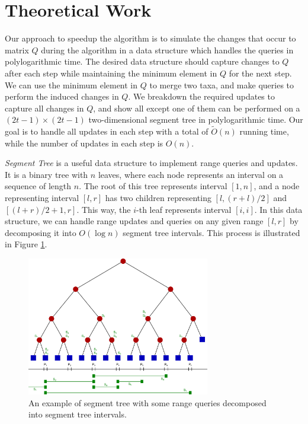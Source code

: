 \section{Theoretical Work}

Our approach to speedup the algorithm is to simulate the changes that occur to matrix $Q$ during the algorithm in a data structure which handles the queries in polylogarithmic time. The desired data structure should capture changes to $Q$ after each step while maintaining the minimum element in $Q$ for the next step. We can use the minimum element in $Q$ to merge two taxa, and make queries to perform the induced changes in $Q$. We breakdown the required updates to capture all changes in $Q$, and show all except one of them can be performed on a $(2t-1) \times (2t-1)$ two-dimensional segment tree in polylogarithmic time. Our goal is to handle all updates in each step with a total of $\widetilde{O}(n)$ running time, while the number of updates in each step is $O(n)$.

\emph{Segment Tree} is a useful data structure to implement range queries and updates. It is a binary tree with $n$ leaves, where each node represents an interval on a sequence of length $n$. The root of this tree represents interval $[1, n]$, and a node representing interval $[l, r]$ has two children representing $[l, (r + l) / 2]$ and $[(l + r) / 2 + 1, r]$. This way, the $i$-th leaf represents interval $[i, i]$. In this data structure, we can handle range updates and queries on any given range $[l, r]$ by decomposing it into $O(\log{n})$ segment tree intervals. This process is illustrated in Figure \ref{segment-tree}.

\begin{figure}[h!]\label{segment-tree}
	\caption{An example of segment tree with some range queries decomposed into segment tree intervals.}
	\begin{center}
		\includegraphics[width=8cm]{Segment_tree.png}
	\end{center}
\end{figure}

